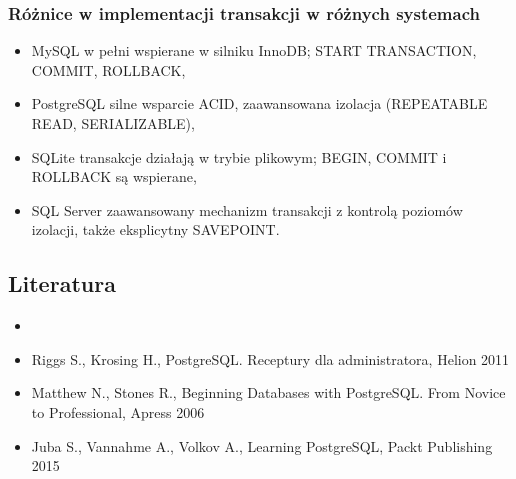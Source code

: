 \documentclass[letterpaper,10pt,polish]{sphinxmanual}
\begin{document}
\subsubsection{Różnice w implementacji transakcji w różnych systemach}
\label{\detokenize{rozdzial2/Kontrola_i_konserwacja/kontrola_i_konserwacja:roznice-w-implementacji-transakcji-w-roznych-systemach}}\begin{itemize}
\item {} 
\sphinxAtStartPar
MySQL \sphinxhyphen{} w pełni wspierane w silniku InnoDB; START TRANSACTION, COMMIT, ROLLBACK,

\item {} 
\sphinxAtStartPar
PostgreSQL \sphinxhyphen{} silne wsparcie ACID, zaawansowana izolacja (REPEATABLE READ, SERIALIZABLE),

\item {} 
\sphinxAtStartPar
SQLite \sphinxhyphen{} transakcje działają w trybie plikowym; BEGIN, COMMIT i ROLLBACK są wspierane,

\item {} 
\sphinxAtStartPar
SQL Server \sphinxhyphen{} zaawansowany mechanizm transakcji z kontrolą poziomów izolacji, także eksplicytny SAVEPOINT.

\end{itemize}


\subsection{Literatura}
\label{\detokenize{rozdzial2/Kontrola_i_konserwacja/kontrola_i_konserwacja:literatura}}\begin{itemize}
\item {} 
\sphinxAtStartPar
{}

\item {} 
\sphinxAtStartPar
Riggs S., Krosing H., PostgreSQL. Receptury dla administratora, Helion 2011

\item {} 
\sphinxAtStartPar
Matthew N., Stones R., Beginning Databases with PostgreSQL. From Novice to Professional, Apress 2006

\item {} 
\sphinxAtStartPar
Juba S., Vannahme A., Volkov A., Learning PostgreSQL, Packt Publishing 2015

\end{itemize}

\sphinxstepscope
\end{document}

